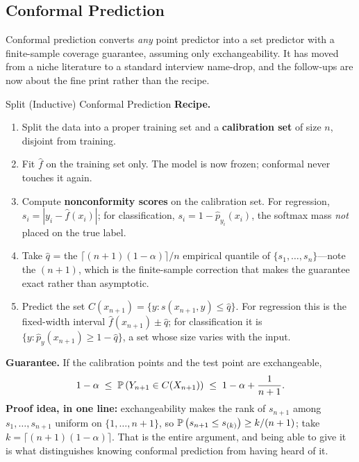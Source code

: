 \subsection{Conformal Prediction}
\label{cml:sec:conformal}

Conformal prediction converts \textit{any} point predictor into a set predictor with a finite-sample coverage guarantee, assuming only exchangeability. It has moved from a niche literature to a standard interview name-drop, and the follow-ups are now about the fine print rather than the recipe.

\begin{mathresult}{Split (Inductive) Conformal Prediction}
\textbf{Recipe.}
\begin{enumerate}
    \item Split the data into a proper training set and a \textbf{calibration set} of size $n$, disjoint from training.
    \item Fit $\hat f$ on the training set only. The model is now frozen; conformal never touches it again.
    \item Compute \textbf{nonconformity scores} on the calibration set. For regression, $s_i = |y_i - \hat f(x_i)|$; for classification, $s_i = 1 - \hat p_{y_i}(x_i)$, the softmax mass \textit{not} placed on the true label.
    \item Take $\hat q$ = the $\big\lceil (n+1)(1-\alpha)\big\rceil / n$ empirical quantile of $\{s_1,\dots,s_n\}$---note the $(n+1)$, which is the finite-sample correction that makes the guarantee exact rather than asymptotic.
    \item Predict the set $C(x_{n+1}) = \{y : s(x_{n+1}, y) \le \hat q\}$. For regression this is the fixed-width interval $\hat f(x_{n+1}) \pm \hat q$; for classification it is $\{y : \hat p_y(x_{n+1}) \ge 1 - \hat q\}$, a set whose size varies with the input.
\end{enumerate}
\textbf{Guarantee.} If the calibration points and the test point are exchangeable,
\begin{equation}
1 - \alpha \;\le\; \mathbb{P}\left(Y_{n+1} \in C(X_{n+1})\right) \;\le\; 1 - \alpha + \frac{1}{n+1} .
\end{equation}
\textbf{Proof idea, in one line:} exchangeability makes the rank of $s_{n+1}$ among $s_1,\dots,s_{n+1}$ uniform on $\{1,\dots,n+1\}$, so $\mathbb{P}\left(s_{n+1} \le s_{(k)}\right) \ge k/(n+1)$; take $k = \lceil (n+1)(1-\alpha)\rceil$. That is the entire argument, and being able to give it is what distinguishes knowing conformal prediction from having heard of it.
\end{mathresult}

